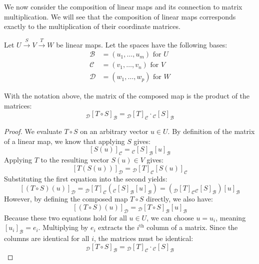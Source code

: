 \documentclass[../linear_algebra_and_groups.tex]{subfiles}
\begin{document}
We now consider the composition of linear maps and its connection to matrix multiplication. We will see that the composition of linear maps corresponds exactly to the multiplication of their coordinate matrices.

Let $U \xrightarrow{S} V \xrightarrow{T} W$ be linear maps. Let the spaces have the following bases:
\begin{align*}
    \mathcal{B} &= (u_1, \dots, u_m) \text{ for } U \\
    \mathcal{C} &= (v_1, \dots, v_n) \text{ for } V \\
    \mathcal{D} &= (w_1, \dots, w_p) \text{ for } W
\end{align*}

\begin{proposition}
    \begin{shaded*}
        With the notation above, the matrix of the composed map is the product of the matrices:
        \[ {}_\mathcal{D}[T\circ S]_\mathcal{B} = {}_\mathcal{D}[T]_\mathcal{C} \cdot {}_\mathcal{C}[S]_\mathcal{B} \]
    \end{shaded*}
\end{proposition}
\begin{proof}
    We evaluate $T \circ S$ on an arbitrary vector $u \in U$. By definition of the matrix of a linear map, we know that applying $S$ gives:
    \[ [S(u)]_\mathcal{C} = {}_\mathcal{C}[S]_\mathcal{B}[u]_\mathcal{B} \]
    Applying $T$ to the resulting vector $S(u) \in V$ gives:
    \[ [T(S(u))]_\mathcal{D} = {}_\mathcal{D}[T]_\mathcal{C}[S(u)]_\mathcal{C} \]
    Substituting the first equation into the second yields:
    \[ [(T\circ S)(u)]_\mathcal{D} = {}_\mathcal{D}[T]_\mathcal{C} \left( {}_\mathcal{C}[S]_\mathcal{B}[u]_\mathcal{B} \right) = \left( {}_\mathcal{D}[T]_\mathcal{C} {}_\mathcal{C}[S]_\mathcal{B} \right) [u]_\mathcal{B} \]
    However, by defining the composed map $T \circ S$ directly, we also have:
    \[ [(T\circ S)(u)]_\mathcal{D} = {}_\mathcal{D}[T\circ S]_\mathcal{B}[u]_\mathcal{B} \]
    Because these two equations hold for all $u \in U$, we can choose $u = u_i$, meaning $[u_i]_\mathcal{B} = e_i$. Multiplying by $e_i$ extracts the $i^{\mathrm{th}}$ column of a matrix. Since the columns are identical for all $i$, the matrices must be identical:
    \[ {}_\mathcal{D}[T\circ S]_\mathcal{B} = {}_\mathcal{D}[T]_\mathcal{C} \cdot {}_\mathcal{C}[S]_\mathcal{B} \]
    \qedhere
\end{proof}
\end{document}
